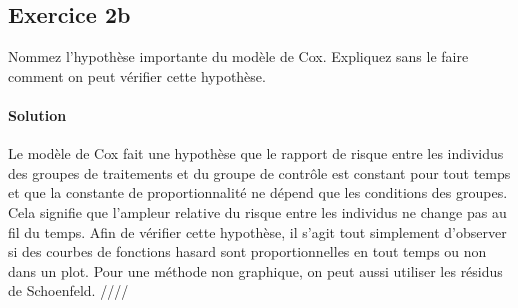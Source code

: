 \documentclass[../main.tex]{subfiles}
\begin{document}
\begin{CJK*}{UTF8}{gbsn}
    
\section*{Exercice 2b}
Nommez l'hypothèse importante du modèle de Cox. 
Expliquez sans le faire comment on peut vérifier cette hypothèse.
    
\paragraph{Solution}

Le modèle de Cox fait une hypothèse que 
le rapport de risque entre les individus des groupes 
de traitements et du groupe de contrôle
est constant pour tout temps et que la constante 
de proportionnalité ne dépend que les conditions des groupes.
Cela signifie que l'ampleur relative 
du risque entre les individus ne change pas au fil du temps.
Afin de vérifier cette hypothèse, il s'agit tout simplement d'observer si des courbes de 
fonctions hasard sont proportionnelles en tout temps ou non dans un plot.
Pour une méthode non graphique, on peut aussi utiliser les résidus de Schoenfeld. ////

\end{CJK*}
\end{document}
